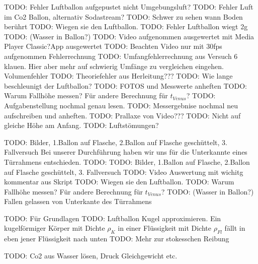 \documentclass{article}
\begin{document}
        TODO: Fehler Luftballon aufgepustet nicht Umgebungsluft?
        TODO: Fehler Luft im Co2 Ballon, alternativ Sodastream?
        TODO: Schwer zu sehen wann Boden berührt
        TODO: Wiegen sie den Luftballon.
        TODO: Fehler Luftballon wiegt 2g
        TODO: (Wasser in Ballon?)
        TODO: Video aufgenommen ausgewertet mit Media Player Classic?App ausgewertet
        TODO: Beachten Video nur mit 30fps aufgenommen Fehlerrechnung
        TODO: Umfangfehlerrechnung aus Versuch 6 klauen. Hier aber mehr auf schwierig Umfänge zu vergleichen eingehen. Volumenfehler
        TODO: Theoriefehler aus Herleitung???
        TODO: Wie lange beschleunigt der Luftballon?
        TODO: FOTOS und Messwerte anheften
        TODO: Warum Fallhöhe messen? Für andere Berechnung für \(t_{Venus}\)?
        TODO: Aufgabenstellung nochmal genau lesen.
        TODO: Messergebnise nochmal neu aufschreiben und anheften.
        TODO: Prallaxe von Video???
        TODO: Nicht auf gleiche Höhe am Anfang.
        TODO: Luftstömungen?

        TODO: Bilder, 1.Ballon auf Flasche, 2.Ballon auf Flasche geschüttelt, 3. Fallversuch
        Bei unserer Durchführung haben wir uns für die Unterkannte eines Türrahmens entschieden. TODO:
        TODO: Bilder, 1.Ballon auf Flasche, 2.Ballon auf Flasche geschüttelt, 3. Fallversuch
        TODO: Video Auswertung mit wichitg kommentar aus Skript
        TODO: Wiegen sie den Luftballon.
        TODO: Warum Fallhöhe messen? Für andere Berechnung für \(t_{Venus}\)?
        TODO: (Wasser in Ballon?)
        Fallen gelassen von Unterkante des Türrahmens

        TODO: Für Grundlagen
        TODO: Luftballon Kugel approximieren. Ein kugelförmiger Körper mit Dichte \(\rho_K\) in einer Flüssigkeit mit Dichte \(\rho_{Fl}\) fällt in eben jener Flüssigkeit nach unten
        TODO: Mehr zur stokesschen Reibung
    
        TODO: Co2 aus Wasser lösen, Druck Gleichgewicht etc.

    \printbibliography[title={Quellen}]
\end{document}
